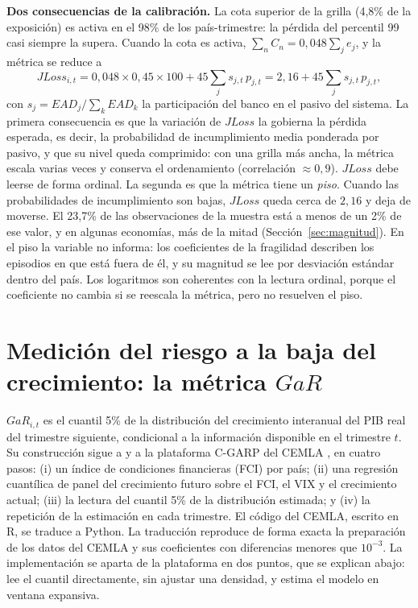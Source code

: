 \noindent\textbf{Dos consecuencias de la calibración.} La cota superior de la grilla (4,8\% de la exposición) es activa en el 98\% de los país-trimestre: la pérdida del percentil 99 casi siempre la supera. Cuando la cota es activa, $\sum_nC_n=0{,}048\sum_je_j$, y la métrica se reduce a
\[ JLoss_{i,t}=0{,}048\times0{,}45\times100+45\sum_j s_{j,t}\,p_{j,t}=2{,}16+45\sum_j s_{j,t}\,p_{j,t}, \]
con $s_j=EAD_j/\sum_kEAD_k$ la participación del banco en el pasivo del sistema. La primera consecuencia es que la variación de $JLoss$ la gobierna la pérdida esperada, es decir, la probabilidad de incumplimiento media ponderada por pasivo, y que su nivel queda comprimido: con una grilla más ancha, la métrica escala varias veces y conserva el ordenamiento (correlación $\approx0{,}9$). $JLoss$ debe leerse de forma ordinal. La segunda es que la métrica tiene un \emph{piso}. Cuando las probabilidades de incumplimiento son bajas, $JLoss$ queda cerca de $2{,}16$ y deja de moverse. El 23,7\% de las observaciones de la muestra está a menos de un 2\% de ese valor, y en algunas economías, más de la mitad (Sección~\ref{sec:magnitud}). En el piso la variable no informa: los coeficientes de la fragilidad describen los episodios en que está fuera de él, y su magnitud se lee por desviación estándar dentro del país. Los logaritmos son coherentes con la lectura ordinal, porque el coeficiente no cambia si se reescala la métrica, pero no resuelven el piso.

\section{Medición del riesgo a la baja del crecimiento: la métrica \texorpdfstring{$GaR$}{GaR}}
\label{sec:gar}

$GaR_{i,t}$ es el cuantil 5\% de la distribución del crecimiento interanual del PIB real del trimestre siguiente, condicional a la información disponible en el trimestre $t$. Su construcción sigue a \citet{ABG2019b} y a la plataforma C-GARP del CEMLA \citep{OssandonBusch2022}, en cuatro pasos: (i) un índice de condiciones financieras (FCI) por país; (ii) una regresión cuantílica de panel del crecimiento futuro sobre el FCI, el VIX y el crecimiento actual; (iii) la lectura del cuantil 5\% de la distribución estimada; y (iv) la repetición de la estimación en cada trimestre. El código del CEMLA, escrito en R, se traduce a Python. La traducción reproduce de forma exacta la preparación de los datos del CEMLA y sus coeficientes con diferencias menores que $10^{-3}$. La implementación se aparta de la plataforma en dos puntos, que se explican abajo: lee el cuantil directamente, sin ajustar una densidad, y estima el modelo en ventana expansiva.

